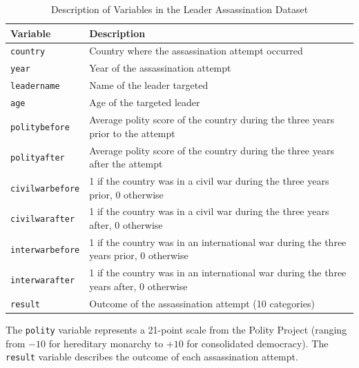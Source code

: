 \documentclass[12pt]{article}
\begin{document}
\begin{table}[H]
\centering
\caption{Description of Variables in the Leader Assassination Dataset}\label{tab:leader-data}
\begin{tabular}{ll}
\toprule
\textbf{Variable} & \textbf{Description} \\
\midrule
\texttt{country} & Country where the assassination attempt occurred \\
\texttt{year} & Year of the assassination attempt \\
\texttt{leadername} & Name of the leader targeted \\
\texttt{age} & Age of the targeted leader \\
\texttt{politybefore} & Average polity score of the country during the three years prior to the attempt \\
\texttt{polityafter} & Average polity score of the country during the three years after the attempt \\
\texttt{civilwarbefore} & 1 if the country was in a civil war during the three years prior, 0 otherwise \\
\texttt{civilwarafter} & 1 if the country was in a civil war during the three years after, 0 otherwise \\
\texttt{interwarbefore} & 1 if the country was in an international war during the three years prior, 0 otherwise \\
\texttt{interwarafter} & 1 if the country was in an international war during the three years after, 0 otherwise \\
\texttt{result} & Outcome of the assassination attempt (10 categories) \\
\bottomrule
\end{tabular}
\end{table}

The \texttt{polity} variable represents a 21-point scale from the Polity Project (ranging from $-10$ for hereditary monarchy to $+10$ for consolidated democracy). The \texttt{result} variable describes the outcome of each assassination attempt.
\end{document}
